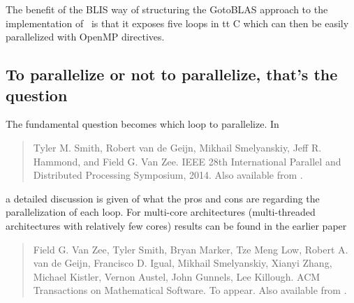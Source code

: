 The benefit of the BLIS way of structuring the GotoBLAS approach to the implementation of \Gemm\ is that it exposes five loops in {tt C} which can then be easily parallelized with OpenMP directives.

\subsection{To parallelize or not to parallelize, that's the question}

The fundamental question becomes which loop to parallelize.  In~\cite{BLIS3}
\begin{quote}
	Tyler M. Smith, Robert van de Geijn, Mikhail  Smelyanskiy, Jeff R. Hammond, and Field G. Van Zee.
	 IEEE 28th International Parallel and Distributed Processing Symposium, 2014.  Also available from .
\end{quote} 
a detailed discussion is given of what the pros and cons are regarding the parallelization of each loop.
For multi-core architectures (multi-threaded architectures with relatively few cores) results can be found in the earlier paper~\cite{BLIS2} 
\begin{quote}
	Field G. Van Zee, Tyler Smith, Bryan Marker, Tze Meng Low, Robert A. van de Geijn, Francisco D. Igual, Mikhail Smelyanskiy, Xianyi Zhang, Michael Kistler, Vernon Austel, John Gunnels, Lee Killough. 
		ACM Transactions on Mathematical Software.  To appear. Also available from .
\end{quote}
